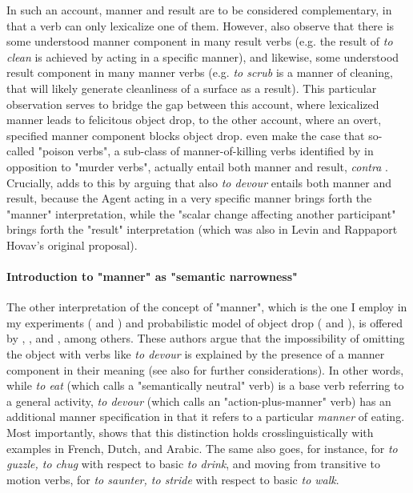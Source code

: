 In such an account, manner and result are to be considered complementary, in that a verb can only lexicalize one of them. However, \textcite{LevinRappaportHovav2008} also observe that there is some understood manner component in many result verbs (e.g. the result of \textit{to clean} is achieved by acting in a specific manner), and likewise, some understood result component in many manner verbs (e.g. \textit{to scrub} is a manner of cleaning, that will likely generate cleanliness of a surface as a result). This particular observation serves to bridge the gap between this account, where lexicalized manner leads to felicitous object drop, to the other account, where an overt, specified manner component blocks object drop. \textcite[5]{BeaversKoontzGarboden2012} even make the case that so-called "poison verbs", a sub-class of manner-of-killing verbs identified by \textcite[230-233]{Levin1993} in opposition to "murder verbs", actually entail both manner and result, \textit{contra} \textcite{LevinRappaportHovav2008, RappaportLevin1998building}. Crucially, \textcite[71, 89]{Melchin2019} adds to this by arguing that also \textit{to devour} entails both manner and result, because the Agent acting in a very specific manner brings forth the "manner" interpretation, while the "scalar change affecting another participant" brings forth the "result" interpretation (which was also in Levin and Rappaport Hovav's original proposal).

\paragraph{Introduction to "manner" as "semantic narrowness"}
The other interpretation of the concept of "manner", which is the one I employ in my experiments ( and ) and probabilistic model of object drop ( and ), is offered by \textcite{Rice1988}, \textcite{FellbaumKegl1989taxonomic}, and \textcite{Naess2007}, among others. These authors argue that the impossibility of omitting the object with verbs like \textit{to devour} is explained by the presence of a manner component in their meaning (see also \textcite{Garcia-VelascoMunoz2002} for further considerations). In other words, while \textit{to eat} (which \textcite{Rice1988} calls a "semantically neutral" verb) is a base verb referring to a general activity, \textit{to devour} (which \textcite{Rice1988} calls an "action-plus-manner" verb) has an additional manner specification in that it refers to a particular \textit{manner} of eating. Most importantly, \textcite[49-50]{Melchin2019} shows that this distinction holds crosslinguistically with examples in French, Dutch, and Arabic. The same also goes, for instance, for \textit{to guzzle, to chug} with respect to basic \textit{to drink}, and moving from transitive to motion verbs, for \textit{to saunter, to stride} with respect to basic \textit{to walk}.

